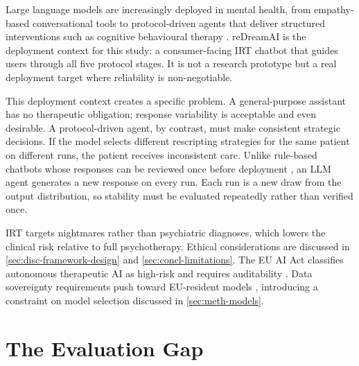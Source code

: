 Large language models are increasingly deployed in mental health, from empathy-based conversational tools to protocol-driven agents that deliver structured interventions such as cognitive behavioural therapy \autocite{DTKNEPHQ,R3Y7UHDE}.
reDreamAI is the deployment context for this study: a consumer-facing IRT chatbot that guides users through all five protocol stages.
It is not a research prototype but a real deployment target where reliability is non-negotiable.

This deployment context creates a specific problem.
A general-purpose assistant has no therapeutic obligation; response variability is acceptable and even desirable.
A protocol-driven agent, by contrast, must make consistent strategic decisions.
If the model selects different rescripting strategies for the same patient on different runs, the patient receives inconsistent care.
Unlike rule-based chatbots whose responses can be reviewed once before deployment \autocite{YE8KQTNH}, an LLM agent generates a new response on every run.
Each run is a new draw from the output distribution, so stability must be evaluated repeatedly rather than verified once.

IRT targets nightmares rather than psychiatric diagnoses, which lowers the clinical risk relative to full psychotherapy.
Ethical considerations are discussed in \autoref{sec:disc-framework-design} and \autoref{sec:concl-limitations}.
The EU AI Act classifies autonomous therapeutic AI as high-risk and requires auditability \autocite{X5TYM56Q,A823HQRV}.
Data sovereignty requirements push toward EU-resident models \autocite{2QMKF3RM}, introducing a constraint on model selection discussed in \autoref{sec:meth-models}.

\section{The Evaluation Gap}
\label{sec:intro-eval-gap}

